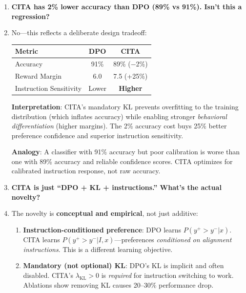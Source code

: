 \begin{enumerate}[label=\textbf{Q\arabic*.}, leftmargin=*, itemsep=8pt]
\vspace{4mm}

\item[\ding{93}] \textbf{CITA has 2\% lower accuracy than DPO (89\% vs 91\%). Isn't this a regression?}

\item[\ding{224}] No---this reflects a deliberate design tradeoff:

\begin{table}[H]
\centering
\small
\begin{tabular}{@{}lcc@{}}
\toprule
\textbf{Metric} & \textbf{DPO} & \textbf{CITA} \\
\midrule
Accuracy & 91\% & 89\% ($-$2\%) \\
\hline
Reward Margin & 6.0 & 7.5 (+25\%) \\
\hline
Instruction Sensitivity & Lower & \textbf{Higher} \\
\bottomrule
\end{tabular}
\end{table}

\textbf{Interpretation}: CITA's mandatory KL prevents overfitting to the training distribution (which inflates accuracy) while enabling stronger \textit{behavioral differentiation} (higher margins). The 2\% accuracy cost buys 25\% better preference confidence and superior instruction sensitivity.

\textbf{Analogy}: A classifier with 91\% accuracy but poor calibration is worse than one with 89\% accuracy and reliable confidence scores. CITA optimizes for calibrated instruction response, not raw accuracy.

\vspace{4mm}

\item[\ding{93}] \textbf{CITA is just ``DPO + KL + instructions.'' What's the actual novelty?}

\item[\ding{224}] The novelty is \textbf{conceptual and empirical}, not just additive:

\begin{enumerate}[leftmargin=*,itemsep=2pt]
    \item \textbf{Instruction-conditioned preference}: DPO learns $P(y^+ > y^- | x)$. CITA learns $P(y^+ > y^- | I, x)$---preferences \textit{conditioned on alignment instructions}. This is a different learning objective.

    \item \textbf{Mandatory (not optional) KL}: DPO's KL is implicit and often disabled. CITA's $\lambda_{\text{KL}} > 0$ is \textit{required} for instruction switching to work. Ablations show removing KL causes 20--30\% performance drop.


\end{enumerate}
\end{enumerate}
